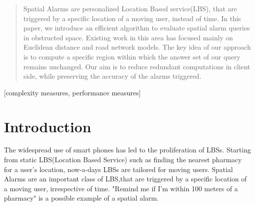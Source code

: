 \documentclass{sig-alternate}
\begin{document}

\maketitle
\begin{abstract}
Spatial Alarms are personalized Location Based service(LBS), that are triggered by a specific location of a moving user, instead of time. In this paper, we introduce an efficient algorithm to evaluate spatial alarm queries in obstructed space. Existing work in this area has focused mainly on Euclidean distance and road network models. The key idea of our approach is to compute a specific region within which the answer set of our query remains unchanged. Our aim is to reduce redundant computations in client side, while preserving the accuracy of the alarms triggered.
\end{abstract}

[complexity measures, performance measures]


\newtheorem{thm}{Theorem}[section] %

\newtheorem{defn}[thm]{Definition} %
\newtheorem{exmp}[thm]{Example} %

\section{Introduction}
The widespread use of smart phones has led to the proliferation of LBSs. %
Starting from static LBS(Location Based Service) such as finding the nearest pharmacy for a user's location, now-a-days LBSs are tailored for moving users. Spatial Alarms are an important class of LBS,that are triggered by a specific location of a moving user, irrespective of time. "Remind me if I'm within 100 meters of a pharmacy" is a possible example of a spatial alarm.
\end{document}
